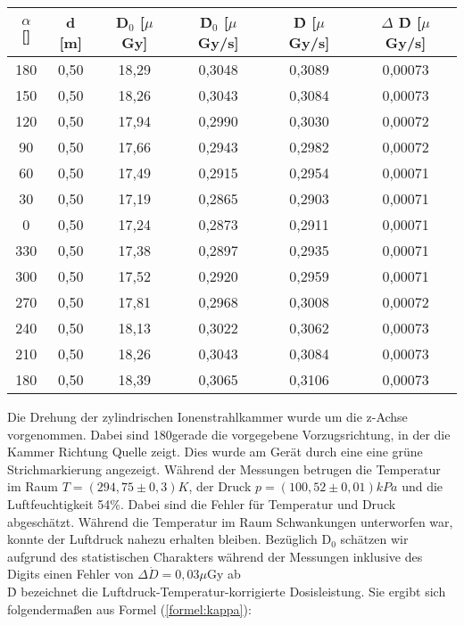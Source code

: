 \vspace{5mm}
	\begin{center}
		\begin{tabular}{c|c|c|c|c|c}
				\textbf{$\alpha$} [\textdegree] & \textbf{d} [m] & \textbf{D$_0$} [$\mu$Gy] & \textbf{\.D$_0$} [$\mu$Gy/s] & \textbf{\.D} [$\mu$ Gy/s] & $\Delta$ \textbf{\.D} [$\mu$Gy/s]\\ 
		\hline	180 & 0,50 & 18,29 & 0,3048 & 0,3089 & 0,00073 \\ 
				150 & 0,50 & 18,26 & 0,3043 & 0,3084 & 0,00073 \\ 
				120 & 0,50 & 17,94 & 0,2990 & 0,3030 & 0,00072 \\ 
				90  & 0,50 & 17,66 & 0,2943 & 0,2982 & 0,00072 \\ 
				60  & 0,50 & 17,49 & 0,2915 & 0,2954 & 0,00071 \\ 
				30  & 0,50 & 17,19 & 0,2865 & 0,2903 & 0,00071 \\ 
				0   & 0,50 & 17,24 & 0,2873 & 0,2911 & 0,00071 \\ 
				330 & 0,50 & 17,38 & 0,2897 & 0,2935 & 0,00071 \\ 
				300 & 0,50 & 17,52 & 0,2920 & 0,2959 & 0,00071 \\ 
				270 & 0,50 & 17,81 & 0,2968 & 0,3008 & 0,00072 \\ 
				240 & 0,50 & 18,13 & 0,3022 & 0,3062 & 0,00073 \\ 
			    210 & 0,50 & 18,26 & 0,3043 & 0,3084 & 0,00073 \\ 
		\hline	180 & 0,50 & 18,39 & 0,3065 & 0,3106 & 0,00073 \\ 
		\end{tabular} 
		\label{dft:Winkel}
	\end{center}
Die Drehung der zylindrischen Ionenstrahlkammer wurde um die z-Achse vorgenommen. Dabei sind 180\textdegree gerade die vorgegebene Vorzugsrichtung, in der die Kammer Richtung Quelle zeigt. Dies wurde am Gerät durch eine eine grüne Strichmarkierung angezeigt. Während der Messungen betrugen die Temperatur im Raum $T = (294,75\pm 0,3)K$, der Druck $p = (100,52 \pm 0,01)kPa$ und die Luftfeuchtigkeit 54\%. Dabei sind die Fehler für Temperatur und Druck abgeschätzt. Während die Temperatur im Raum Schwankungen unterworfen war, konnte der Luftdruck nahezu erhalten bleiben. Bezüglich D$_0$ schätzen wir aufgrund des statistischen Charakters während der Messungen inklusive des Digits einen Fehler von $\Delta \dot{D} = 0,03\mu$Gy ab\\
\.D bezeichnet die Luftdruck-Temperatur-korrigierte Dosisleistung. Sie ergibt sich folgendermaßen aus Formel (\ref{formel:kappa}):

